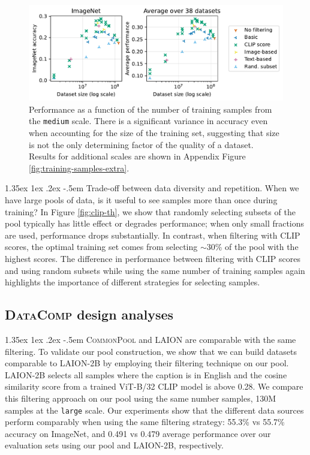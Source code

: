 \documentclass[dvipsnames,11pt]{article}
\makeatletter
\renewcommand\paragraph{\@startsection{paragraph}{4}{\z@}                                     {1.35ex \@plus1ex \@minus.2ex}                                {-.5em}
{\normalfont\normalsize\bfseries}}
\newcommand{\datanet}{\textsc{DataComp}\xspace}
\newcommand{\pool}{\textsc{CommonPool}\xspace}
\makeatother
\begin{document}
\begin{figure}[h!]
    \centering
    \includegraphics[width=.95\linewidth]{figures/train_samples_medium.pdf}
    \caption{Performance as a function of the number of training samples from the {\small\texttt{medium}} scale. There is a significant variance in accuracy even when accounting for the size of the training set, suggesting that size is not the only determining factor of the quality of a dataset. Results for additional scales are shown in Appendix Figure \ref{fig:training-samples-extra}.}
    \label{fig:training-samples}
\end{figure}


\paragraph{Trade-off between data diversity and repetition.}
When we have large pools of data, is it useful to see samples more than once during training?
In Figure \ref{fig:clip-th}, we show that randomly selecting subsets of the pool typically has little effect or degrades performance; when only small fractions are used, performance drops substantially. 
In contrast, when filtering with CLIP scores, the optimal training set comes from selecting $\sim$30\% of the pool with the highest scores.
The difference in performance between filtering with CLIP scores and using random subsets while using the same number of training samples again highlights the importance of different strategies for selecting samples.




\subsection{\datanet design analyses}

\paragraph{\pool and LAION are comparable with the same filtering.} To validate our pool construction, we show that we can build datasets comparable to LAION-2B by employing their filtering technique on our pool.
LAION-2B selects all samples where the caption is in English and the cosine similarity score from a trained ViT-B/32 CLIP model is above 0.28. We compare this filtering approach on our pool using the same number samples, 130M samples at the {\small \texttt{large}} scale.
Our experiments show that the different data sources perform comparably when using the same filtering strategy: 55.3\% vs 55.7\% accuracy on ImageNet, and 0.491 vs 0.479 average performance over our evaluation sets using our pool and LAION-2B, respectively.
\end{document}
